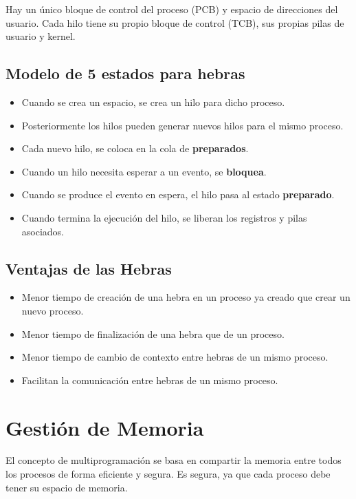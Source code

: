 \begin{definicion}
    Hay un único bloque de control del proceso (PCB) y espacio de direcciones del usuario. Cada hilo tiene su propio bloque de control (TCB), sus propias pilas de usuario y kernel.
\end{definicion}

\subsection{Modelo de 5 estados para hebras}
\begin{itemize}
    \item Cuando se crea un espacio, se crea un hilo para dicho proceso.

    \item Posteriormente los hilos pueden generar nuevos hilos para el mismo proceso.

    \item Cada nuevo hilo, se coloca en la cola de \textbf{preparados}.

    \item Cuando un hilo necesita esperar a un evento, se \textbf{bloquea}.

    \item Cuando se produce el evento en espera, el hilo pasa al estado \textbf{preparado}.

    \item Cuando termina la ejecución del hilo, se liberan los registros y pilas asociados.
\end{itemize}

\subsection{Ventajas de las Hebras}
\begin{itemize}
    \item Menor tiempo de creación de una hebra en un proceso ya creado que crear un nuevo proceso.

    \item Menor tiempo de finalización de una hebra que de un proceso.

    \item Menor tiempo de cambio de contexto entre hebras de un mismo proceso.

    \item Facilitan la comunicación entre hebras de un mismo proceso.
\end{itemize}

\section{Gestión de Memoria}
El concepto de multiprogramación se basa en compartir la memoria entre todos los procesos de forma eficiente y segura. Es segura, ya que cada proceso debe tener su espacio de memoria.

